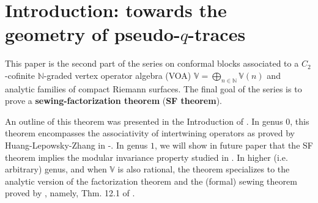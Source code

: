 \documentclass[11pt,b5paper,notitlepage]{article}
\theoremstyle{definition}
\theoremstyle{plain}
\newcommand{\Vbb}{\mathbb V}
\newcommand{\Nbb}{\mathbb N}
\newcommand{\<}{\left\langle}
\renewcommand{\>}{\right\rangle}
\numberwithin{equation}{section}
\begin{document}


	
	
	
	

	
	

	
	
	
	
	
	
	
	
	



\section{Introduction: towards the geometry of pseudo-$q$-traces}

\nocite{HLZ1,HLZ2,HLZ3,HLZ4,HLZ5,HLZ6,HLZ7,HLZ8}



This paper is the second part of the series on conformal blocks associated to a $C_2$-cofinite $\Nbb$-graded vertex operator algebra (VOA) $\Vbb=\bigoplus_{n\in\Nbb}\Vbb(n)$ and analytic families of compact Riemann surfaces. The final goal of the series is to prove a \textbf{sewing-factorization theorem} (\textbf{SF theorem}). 

An outline of this theorem was presented in the Introduction of \cite{GZ1}. In genus $0$, this theorem encompasses the associativity of intertwining operators as proved by Huang-Lepowsky-Zhang in \cite{HLZ1,HLZ2}-\cite{HLZ8}. In genus $1$, we will show in future paper that the SF theorem implies the modular invariance property studied in \cite{Zhu-modular-invariance,Miy-modular-invariance,AN-pseudo-trace,Hua-modular-C2}. In higher (i.e. arbitrary) genus, and when $\Vbb$ is also rational, the theorem specializes to the analytic version of the factorization theorem and the (formal) sewing theorem proved by \cite{DGT2}, namely, Thm. 12.1 of \cite{Gui-sewingconvergence}. 
\end{document}
